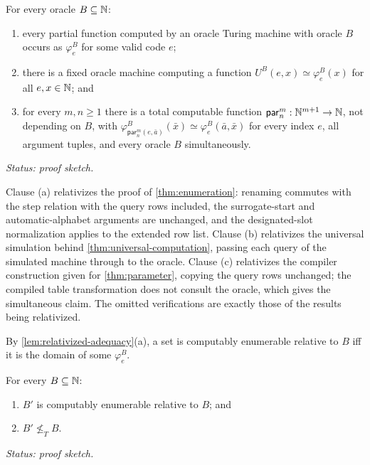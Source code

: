 \begin{lemma}
\label{lem:relativized-adequacy}
For every oracle \(B\subseteq\mathbb{N}\):
\begin{enumerate}[label=(\alph*)]
\item every partial function computed by an oracle Turing machine with
      oracle \(B\) occurs as \(\varphi^B_e\) for some valid code \(e\);
\item there is a fixed oracle machine computing a function
      \(U^B(e,x)\simeq\varphi^B_e(x)\) for all \(e,x\in\mathbb{N}\); and
\item for every \(m,n\geq1\) there is a total computable function
      \(\mathsf{par}_n^m:\mathbb{N}^{m+1}\to\mathbb{N}\), not depending on \(B\), with
      \(\varphi^B_{\mathsf{par}_n^m(e,\bar a)}(\bar x)
      \simeq\varphi^B_e(\bar a,\bar x)\) for every index \(e\), all
      argument tuples, and every oracle \(B\) simultaneously.
\end{enumerate}
\textit{Status: proof sketch.}
\end{lemma}

\begin{proofplan}
Clause (a) relativizes the proof of \cref{thm:enumeration}: renaming
commutes with the step relation with the query rows included, the
surrogate-start and automatic-alphabet arguments are unchanged, and the
designated-slot normalization applies to the extended row list.  Clause
(b) relativizes the universal simulation behind
\cref{thm:universal-computation}, passing each query of the simulated
machine through to the oracle.  Clause (c) relativizes the compiler
construction given for \cref{thm:parameter}, copying the query rows
unchanged; the compiled table transformation does not consult the oracle,
which gives the simultaneous claim.  The omitted verifications are
exactly those of the results being relativized.
\end{proofplan}

By \cref{lem:relativized-adequacy}(a), a set is computably enumerable
relative to \(B\) iff it is the domain of some \(\varphi^B_e\).

\begin{theorem}
\label{thm:jump}
For every \(B\subseteq\mathbb{N}\):
\begin{enumerate}[label=(\alph*)]
\item \(B'\) is computably enumerable relative to \(B\); and
\item \(B'\not\leq_T B\).
\end{enumerate}
\textit{Status: proof sketch.}
\end{theorem}

